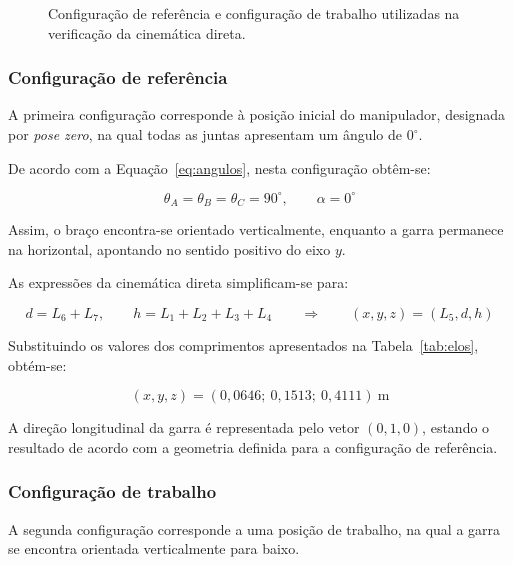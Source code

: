 \begin{figure}[H]
    \centering
    \resizebox{0.7\textwidth}{!}{
        
    }
    \caption{Configuração de referência e configuração de trabalho utilizadas na verificação da cinemática direta.}
    \label{fig:poses_fk}
\end{figure}

\subsubsection{Configuração de referência}

A primeira configuração corresponde à posição inicial do manipulador, designada por \textit{pose zero}, na qual todas as juntas apresentam um ângulo de $0^\circ$.

De acordo com a Equação~\eqref{eq:angulos}, nesta configuração obtêm-se:

\begin{equation}
    \theta_A=\theta_B=\theta_C=90^\circ,
    \qquad \alpha=0^\circ
\end{equation}

Assim, o braço encontra-se orientado verticalmente, enquanto a garra permanece na horizontal, apontando no sentido positivo do eixo $y$.

As expressões da cinemática direta simplificam-se para:

\begin{equation}
    d=L_6+L_7, \qquad
    h=L_1+L_2+L_3+L_4
    \qquad \Rightarrow \qquad
    (x,y,z)=(L_5,d,h)
    \label{eq:pose_zero}
\end{equation}

Substituindo os valores dos comprimentos apresentados na Tabela~\ref{tab:elos}, obtém-se:

\begin{equation}
    (x,y,z)=(0{,}0646;\ 0{,}1513;\ 0{,}4111)
    \ \text{m}
\end{equation}

A direção longitudinal da garra é representada pelo vetor $(0,1,0)$, estando o resultado de acordo com a geometria definida para a configuração de referência.

\subsubsection{Configuração de trabalho}

A segunda configuração corresponde a uma posição de trabalho, na qual a garra se encontra orientada verticalmente para baixo.

